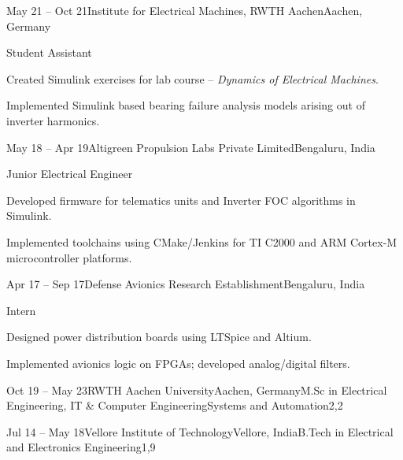 \documentclass[11pt,a4paper,lang=en]{mycv}
\begin{document}
\begin{profexperience}
		\begin{experienceentry}{May 21 -- Oct 21}{Institute for Electrical Machines, RWTH Aachen}{Aachen, Germany}
			\begin{role}{Student Assistant}{}
				\item Created Simulink exercises for lab course -- \emph{Dynamics of Electrical Machines}.
				\item Implemented Simulink based bearing failure analysis models arising out of inverter harmonics.
			\end{role}
		\end{experienceentry}
		\begin{experienceentry}{May 18 -- Apr 19}{Altigreen Propulsion Labs Private Limited}{Bengaluru, India}
			\begin{role}{Junior Electrical Engineer}{}
				\item Developed firmware for telematics units and Inverter FOC algorithms in Simulink.
				\item Implemented toolchains using CMake/Jenkins for TI C2000 and ARM Cortex-M microcontroller platforms.
			\end{role}
		\end{experienceentry}
		\begin{experienceentry}{Apr 17 -- Sep 17}{Defense Avionics Research Establishment}{Bengaluru, India}
			\begin{role}{Intern}{}
				\item Designed power distribution boards using LTSpice and Altium.
				\item Implemented avionics logic on FPGAs; developed analog/digital filters.
			\end{role}
		\end{experienceentry}
	\end{profexperience}
	\begin{academics}
		\begin{acadentry}{Oct 19 -- May 23}{RWTH Aachen University}{Aachen, Germany}{M.Sc in Electrical Engineering, IT \& Computer Engineering}{Systems and Automation}{2,2}
		\end{acadentry}
		\begin{acadentry}{Jul 14 -- May 18}{Vellore Institute of Technology}{Vellore, India}{B.Tech in Electrical and Electronics Engineering}{}{1,9}
		\end{acadentry}
	\end{academics}
	\begin{skills}
	\end{skills}
\end{document}
